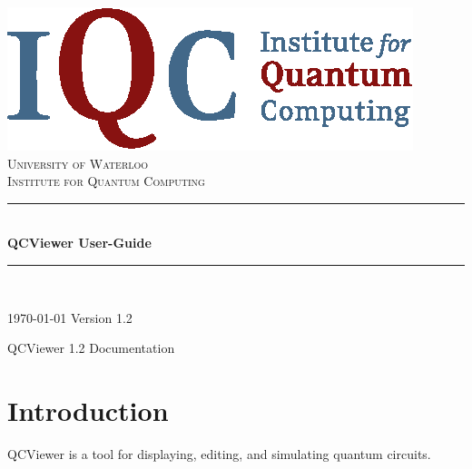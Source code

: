 \documentclass[10pt]{article}
\theoremstyle{definition}
\newcommand{\HRule}{\rule{\linewidth}{0.5mm}}
\newcommand{\qcversion}{1.2} %
\begin{document}
\begin{titlepage}

\begin{center}


\includegraphics{Figures/iqclogo}\\[1cm]    

\textsc{\LARGE University of Waterloo}\\[1.5cm]

\textsc{\Large Institute for Quantum Computing}\\[0.5cm]


\HRule \\[0.4cm]
{ \huge \bfseries QCViewer User-Guide}\\[0.4cm]

\HRule \\[1.5cm]

\vfill

{\large \today}
{\large Version \qcversion{}}

\end{center}

\end{titlepage}

\tableofcontents
\newpage

    \begin{flushright}
    QCViewer \qcversion{} Documentation
    \end{flushright}

\section{Introduction} \label{sec:Introduction}

QCViewer is a tool for displaying, editing, and simulating quantum circuits. 
\end{document}
